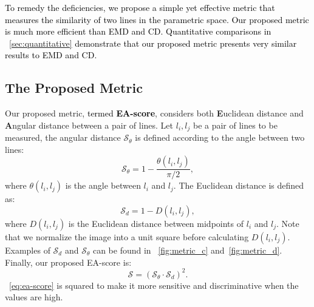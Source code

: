 \documentclass[10pt,journal,cspaper,compsoc]{IEEEtran}
\newcommand{\revise}[1]{{\textcolor{black}{#1}}}
\newcommand{\rerevise}[1]{{\textcolor{black}{#1}}}
\newcommand{\CheckRmv}[1]{}
\newcommand{\CheckRmv}[1]{#1}
\begin{document}
\rerevise{
To remedy the deficiencies,
we propose a simple yet effective metric that measures the similarity 
of two lines in the parametric space.
%
Our proposed metric is much more efficient than EMD and CD.
%
Quantitative comparisons in ~\cref{sec:quantitative} demonstrate that 
our proposed metric presents very similar results to EMD and CD.}


\CheckRmv{
\begin{figure*}[!htb]
  \centering
  \begin{overpic}[width=1\linewidth]{figures/dataset_vis.jpg}
  \end{overpic}\vspace{-8pt}
  \caption{
    Example images and annotations (yellow lines) of \revise{NKL}.
    Images of \revise{NKL} present diverse scenes and rich line annotations.
  }
  \label{fig:dataset_vis}
\end{figure*}
}

\subsection{The Proposed Metric}
Our proposed metric, \revise{termed \textbf{EA-score}}, considers both 
\textbf{E}uclidean distance and \textbf{A}ngular distance
between a pair of lines.
%
Let $l_i, l_j$ be a pair of lines to be measured,
the angular distance $\mathcal{S}_\theta$ is defined according to the
angle between two lines:
\begin{equation}
    \mathcal{S}_\theta = 1 - \frac{\theta(l_i, l_j)}{\pi/2},
    \label{eq:sa}
\end{equation}
where $\theta(l_i, l_j)$ is the angle between $l_i$ and $l_j$.
%
The Euclidean distance is defined as:
%
\begin{equation}
    \mathcal{S}_d = 1 - D(l_i, l_j),
    \label{eq:sd}
\end{equation}
where $D(l_i, l_j)$ is the Euclidean distance between midpoints of $l_i$ and $l_j$.
%
%
Note that we normalize the image into a unit square before calculating $D(l_i, l_j)$.
%
Examples of $\mathcal{S}_d$ and $\mathcal{S}_\theta$ can be found in
~\cref{fig:metric_c} and~\cref{fig:metric_d}.
%
Finally, our proposed EA-score is:
\begin{equation}
    \mathcal{S} = (\mathcal{S}_\theta \cdot \mathcal{S}_d)^2.
    \label{eq:ea-score}
\end{equation}
~\cref{eq:ea-score} is squared to make it more sensitive and discriminative
when the values are high.
\end{document}
